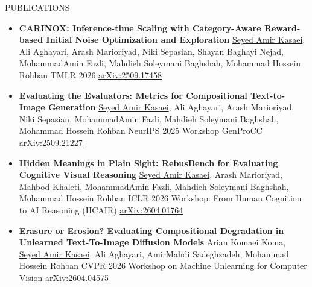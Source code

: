 \documentclass[]{CV}
\begin{document}
\begin{section}{PUBLICATIONS}
\begin{itemize}
    \item \textbf{CARINOX: Inference-time Scaling with Category-Aware Reward-based Initial Noise Optimization and Exploration} \newline
    \underline{Seyed Amir Kasaei}, Ali Aghayari, Arash Marioriyad, Niki Sepasian, Shayan Baghayi Nejad, MohammadAmin Fazli, Mahdieh Soleymani Baghshah, Mohammad Hossein Rohban \newline
    TMLR 2026\newline
    \href{https://arxiv.org/abs/2509.17458}{arXiv:2509.17458}

    \item \textbf{Evaluating the Evaluators: Metrics for Compositional Text-to-Image Generation} \newline
    \underline{Seyed Amir Kasaei}, Ali Aghayari, Arash Marioriyad, Niki Sepasian, MohammadAmin Fazli, Mahdieh Soleymani Baghshah, Mohammad Hossein Rohban \newline
    NeurIPS 2025 Workshop GenProCC \newline
    \href{https://arxiv.org/abs/2509.21227}{arXiv:2509.21227}

    \item \textbf{Hidden Meanings in Plain Sight: RebusBench for Evaluating Cognitive Visual Reasoning} \newline
    \underline{Seyed Amir Kasaei}, Arash Marioriyad, Mahbod Khaleti, MohammadAmin Fazli, Mahdieh Soleymani Baghshah, Mohammad Hossein Rohban \newline
    ICLR 2026 Workshop: From Human Cognition to AI Reasoning (HCAIR) \newline
    \href{https://arxiv.org/abs/2604.01764}{arXiv:2604.01764}

    \item \textbf{Erasure or Erosion? Evaluating Compositional Degradation in Unlearned Text-To-Image Diffusion Models} \newline
    Arian Komaei Koma, \underline{Seyed Amir Kasaei}, Ali Aghayari, AmirMahdi Sadeghzadeh, Mohammad Hossein Rohban \newline
    CVPR 2026 Workshop on Machine Unlearning for Computer Vision \newline
    \href{https://arxiv.org/abs/2604.04575}{arXiv:2604.04575}


\end{itemize}
\end{section}
\end{document}
